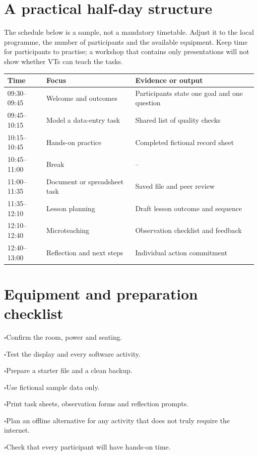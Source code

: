 \documentclass[11pt,openany,oneside]{book}
\newcommand{\checklistitem}{\noindent$\square$\quad}
\begin{document}
\section{A practical half-day structure}
The schedule below is a sample, not a mandatory timetable. Adjust it to the local programme, the number of participants and the available equipment. Keep time for participants to practise; a workshop that contains only presentations will not show whether VTs can teach the tasks.
\begin{longtable}{p{}p{}p{}}
\toprule\textbf{Time} & \textbf{Focus} & \textbf{Evidence or output}\\\midrule
09:30--09:45 & Welcome and outcomes & Participants state one goal and one question\\
09:45--10:15 & Model a data-entry task & Shared list of quality checks\\
10:15--10:45 & Hands-on practice & Completed fictional record sheet\\
10:45--11:00 & Break & --\\
11:00--11:35 & Document or spreadsheet task & Saved file and peer review\\
11:35--12:10 & Lesson planning & Draft lesson outcome and sequence\\
12:10--12:40 & Microteaching & Observation checklist and feedback\\
12:40--13:00 & Reflection and next steps & Individual action commitment\\\bottomrule
\end{longtable}
\section{Equipment and preparation checklist}
\checklistitem Confirm the room, power and seating.\par
\checklistitem Test the display and every software activity.\par
\checklistitem Prepare a starter file and a clean backup.\par
\checklistitem Use fictional sample data only.\par
\checklistitem Print task sheets, observation forms and reflection prompts.\par
\checklistitem Plan an offline alternative for any activity that does not truly require the internet.\par
\checklistitem Check that every participant will have hands-on time.\par
\end{document}
